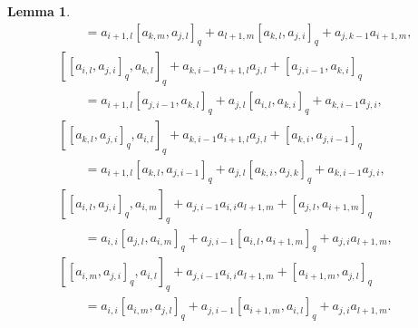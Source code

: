 \documentclass[10pt,a4paper]{amsart}
\numberwithin{equation}{section}
\def\lr#1{\left[#1\right]}
\newtheorem{Lemma}[Theorem]{Lemma}
\begin{document}
\begin{Lemma}
\begin{gather}
 \qquad= a_{i+1,l}\lr{a_{k,m}, a_{j,l}}_q +a_{l+1,m}\lr{a_{k,l}, a_{j,i}}_q +a_{j,k-1}a_{i+1,m}, \tag{4.b} \label{eqn:4b} \\
 [\lr{a_{i,l}, a_{j,i}}_q, a_{k,l}]_q+a_{k,i-1}a_{i+1,l}a_{j,l}+\lr{a_{j,i-1}, a_{k,i}}_q \nonumber \\
 \qquad = a_{i+1,l}\lr{a_{j,i-1}, a_{k,l}}_q +a_{j,l}\lr{a_{i,l}, a_{k,i}}_q+a_{k,i-1}a_{j,i}, \tag{5.a} \\
 [\lr{a_{k,l}, a_{j,i}}_q, a_{i,l}]_q+a_{k,i-1}a_{i+1,l}a_{j,l}+\lr{a_{k,i}, a_{j,i-1}}_q \nonumber \\
 \qquad = a_{i+1,l}\lr{a_{k,l}, a_{j,i-1}}_q+a_{j,l}\lr{a_{k,i}, a_{j,k}}_q+a_{k,i-1}a_{j,i}, \tag{5.b} \\
 [\lr{a_{i,l}, a_{j,i}}_q, a_{i,m}]_q+a_{j,i-1}a_{i,i}a_{l+1,m} +\lr{a_{j,l}, a_{i+1,m} }_q\nonumber \\
 \qquad = a_{i,i}\lr{a_{j,l}, a_{i,m}}_q +a_{j,i-1}\lr{a_{i,l}, a_{i+1,m}}_q+a_{j,i}a_{l+1,m}, \tag{6.a} \label{eqn:6a}\\
 [\lr{a_{i,m}, a_{j,i}}_q, a_{i,l}]_q+a_{j,i-1}a_{i,i}a_{l+1,m} +\lr{a_{i+1,m}, a_{j,l}}_q \nonumber \\
 \qquad = a_{i,i}\lr{a_{i,m}, a_{j,l}}_q+a_{j,i-1}\lr{a_{i+1,m}, a_{i,l}}_q+a_{j,i}a_{l+1,m}. \tag{6.b} \label{eqn:6b}
\end{gather}
\end{Lemma}
\end{document}
